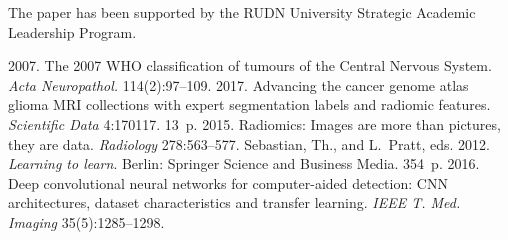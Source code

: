 

\vspace*{-12pt}

\Ack
\noindent
The paper has been supported by the RUDN University Strategic Academic Leadership Program.


  \begin{multicols}{2}

\renewcommand{\bibname}{\protect\rmfamily References}

{\small\frenchspacing
 {%
 \begin{thebibliography}{99}
 2007. The 2007 WHO classification of tumours of the Central 
Nervous System. \textit{Acta Neuropathol.} 114(2):97--109.
 2017. Advancing the cancer genome atlas glioma MRI collections 
with expert segmentation labels and radiomic features. \textit{Scientific Data} 4:170117. 13~p.
 2015. Radiomics: Images are more than 
pictures, they are data. \textit{Radiology} 278:563--577.
Sebastian, Th., and L.~Pratt, eds. 2012. \textit{Learning to learn}. Berlin: Springer Science and 
Business Media. 354~p.
 2016. Deep convolutional neural networks for computer-aided detection: CNN 
architectures, dataset characteristics and transfer learning. \textit{IEEE T. Med. Imaging} 
35(5):1285--1298.
{

}
\end{thebibliography}}}
\end{multicols}
